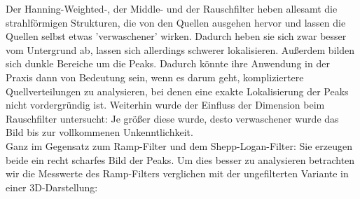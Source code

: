     	            \vspace{5mm}
    	            Der Hanning-Weighted-, der Middle- und der Rauschfilter heben allesamt die strahlförmigen Strukturen, die von den Quellen ausgehen hervor und lassen die Quellen selbst etwas 'verwaschener' wirken. Dadurch heben sie sich zwar besser vom Untergrund ab, lassen sich allerdings schwerer lokalisieren. Außerdem bilden sich dunkle Bereiche um die Peaks. Dadurch könnte ihre Anwendung in der Praxis dann von Bedeutung sein, wenn es darum geht, kompliziertere Quellverteilungen zu analysieren, bei denen eine exakte Lokalisierung der Peaks nicht vordergründig ist. Weiterhin wurde der Einfluss der Dimension beim Rauschfilter untersucht: Je größer diese wurde, desto verwaschener wurde das Bild bis zur vollkommenen Unkenntlichkeit.\\
    	            
    	            Ganz im Gegensatz zum Ramp-Filter und dem Shepp-Logan-Filter: Sie erzeugen beide ein recht scharfes Bild der Peaks. Um dies besser zu analysieren betrachten wir die Messwerte des Ramp-Filters verglichen mit der ungefilterten Variante in einer 3D-Darstellung:\\
    	            
